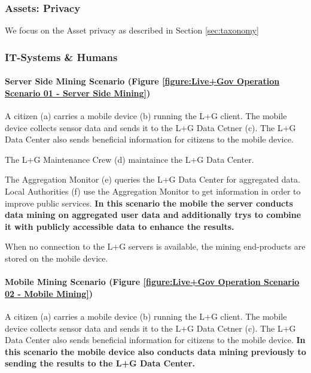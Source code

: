 \subsubsection{Assets: Privacy}

We focus on the Asset privacy as described in Section \ref{sec:taxonomy}


\subsubsection{IT-Systems \& Humans}

\paragraph{Server Side Mining Scenario (Figure \ref{figure:Live+Gov Operation Scenario 01 - Server Side Mining})}





A citizen (a) carries a mobile device (b) running the L+G client. The
mobile device collects sensor data and sends it to the L+G Data Cetner
(c). The L+G Data Center also sends beneficial information for citizens
to the mobile device.

The L+G Maintenance Crew (d) maintaince the L+G Data Center.

The Aggregation Monitor (e) queries the L+G Data Center for aggregated
data. Local Authorities (f) use the Aggregation Monitor to get
information in order to improve public services. \textbf{In this
scenario the mobile the server conducts data mining on aggregated user
data and additionally trys to combine it with publicly accessible data
to enhance the results.}

When no connection to the L+G servers is available, the mining
end-products are stored on the mobile device.

\paragraph{Mobile Mining Scenario (Figure \ref{figure:Live+Gov Operation Scenario 02 - Mobile Mining})}



A citizen (a) carries a mobile device (b) running the L+G client. The
mobile device collects sensor data and sends it to the L+G Data Cetner
(c). The L+G Data Center also sends beneficial information for citizens
to the mobile device. \textbf{In this scenario the mobile device also
conducts data mining previously to sending the results to the L+G Data
Center.}

